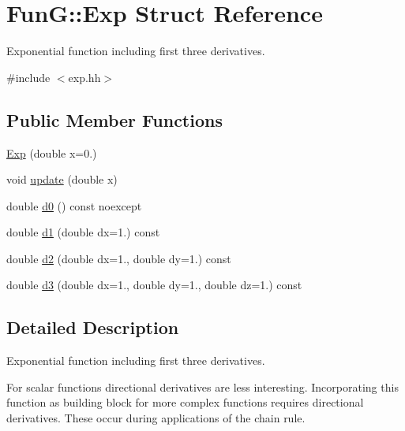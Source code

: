 \hypertarget{structFunG_1_1Exp}{\section{\-Fun\-G\-:\-:\-Exp \-Struct \-Reference}
\label{structFunG_1_1Exp}
}


\-Exponential function including first three derivatives.  




{\ttfamily \#include $<$exp.\-hh$>$}

\subsection*{\-Public \-Member \-Functions}
\begin{DoxyCompactItemize}
\item 
\hyperlink{structFunG_1_1Exp_a2abec31ebf5f8ee4877fb1c05d2fdad2}{\-Exp} (double x=0.)
\item 
void \hyperlink{structFunG_1_1Exp_aabd4ab4e94bdc06bc1e773ffd023e0a7}{update} (double x)
\item 
double \hyperlink{structFunG_1_1Exp_a753d56db833507c33fe91714d119c755}{d0} () const noexcept
\item 
double \hyperlink{structFunG_1_1Exp_ac02fb3f10f654a60fef470b271e26b41}{d1} (double dx=1.) const 
\item 
double \hyperlink{structFunG_1_1Exp_a1a5b4e6b0cedb08548d0e83457908182}{d2} (double dx=1., double dy=1.) const 
\item 
double \hyperlink{structFunG_1_1Exp_adea30657eb96144009f7cc96451391e8}{d3} (double dx=1., double dy=1., double dz=1.) const 
\end{DoxyCompactItemize}


\subsection{\-Detailed \-Description}
\-Exponential function including first three derivatives. 

\-For scalar functions directional derivatives are less interesting. \-Incorporating this function as building block for more complex functions requires directional derivatives. \-These occur during applications of the chain rule. 

